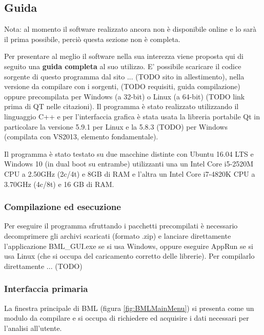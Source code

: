 \documentclass[a4paper]{article}
\begin{document}
	\subsection{\large Guida}

	Nota: al momento il software realizzato ancora non è disponibile online e lo sarà il prima possibile, perciò questa sezione non è completa.

	Per presentare al meglio il software nella sua interezza viene proposta qui di seguito una \textbf{guida completa} al suo utilizzo. E' possibile scaricare
	il codice sorgente di questo programma dal sito ... (TODO sito in allestimento), nella versione da compilare con i sorgenti, (TODO requisiti, guida compilazione)
	oppure precompilata per Windows (a 32-bit) o Linux (a 64-bit) (TODO link prima di QT nelle citazioni). Il programma è stato realizzato utilizzando
	il linguaggio C++ e per l'interfaccia grafica è stata usata la libreria portabile Qt \cite{Qt} in particolare la versione 5.9.1 per Linux e la 
	5.8.3 (TODO) per Windows (compilata con VS2013, elemento fondamentale).

	Il programma è stato testato su due macchine distinte con Ubuntu 16.04 LTS e Windows 10 (in dual boot su entrambe) utilizzanti una 
	un Intel Core i5-2520M CPU a 2.50GHz (2c/4t) e 8GB di RAM e l'altra un Intel Core i7-4820K CPU a 3.70GHz (4c/8t) e 16 GB di RAM.

	\subsubsection{Compilazione ed esecuzione}
	
	Per eseguire il programma sfruttando i pacchetti precompilati è necessario decomprimere gli archivi scaricati (formato .zip)
	e lanciare direttamente l'applicazione BML\_GUI.exe se si usa Windows, oppure eseguire AppRun
	se si usa Linux (che si occupa del caricamento corretto delle librerie).
	Per compilarlo direttamente ... (TODO)

	\subsubsection{Interfaccia primaria}
	
	La finestra principale di BML (figura \ref{fig:BMLMainMenu}) si presenta come un modulo da compilare
	e si occupa di richiedere ed acquisire i dati necessari per l'analisi 
	all'utente. 
\end{document}
